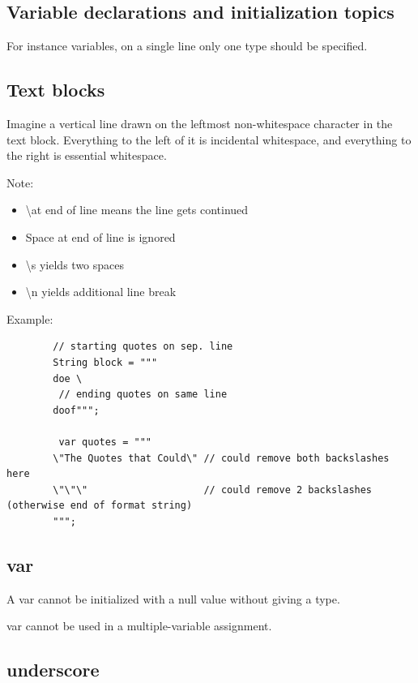 \documentclass{scrartcl}
\begin{document}
\subsection{Variable declarations and initialization topics}

    For instance variables, on a single line only one type should be specified.



\subsection{Text blocks}

    Imagine a vertical line drawn on the leftmost non-­whitespace character in the text block. Everything to the left of it is incidental whitespace, and everything to the right is essential whitespace.

    Note:
    \begin{itemize}
        \item  \textbackslash at end of line means the line gets continued
        \item Space at end of line is ignored
        \item \textbackslash s yields two spaces
        \item  \textbackslash n yields additional line break
    \end{itemize}

    Example:

    \begin{lstlisting}
        // starting quotes on sep. line
        String block = """
        doe \
         // ending quotes on same line
        doof""";

         var quotes = """
        \"The Quotes that Could\" // could remove both backslashes here
        \"\"\"                    // could remove 2 backslashes (otherwise end of format string)
        """;
    \end{lstlisting}

\subsection{var}

    A var cannot be initialized with a null value without giving a type.

    var cannot be used in a multiple-­variable assignment.

\subsection{underscore}
\end{document}
